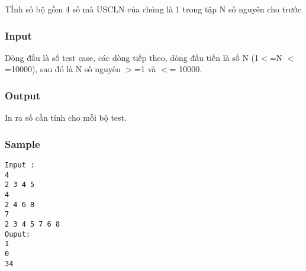 



   TÍnh số bộ gồm 4 số mà USCLN của chúng là 1 trong tập N số nguyên cho trước  



\subsubsection{   Input  }



   Dòng đầu là số test case, các dòng tiếp theo, dòng đầu tiền là số N (1$<$=N $<$=10000),  sau đó là N số nguyên $>$=1 và  $<$= 10000.  



\subsubsection{   Output  }



   In ra số cần tính cho mỗi bộ test.  



\subsubsection{   Sample  }
\begin{verbatim}
Input :
4  
2 3 4 5 
4 
2 4 6 8 
7 
2 3 4 5 7 6 8 
Ouput: 
1 
0 
34 
\end{verbatim}